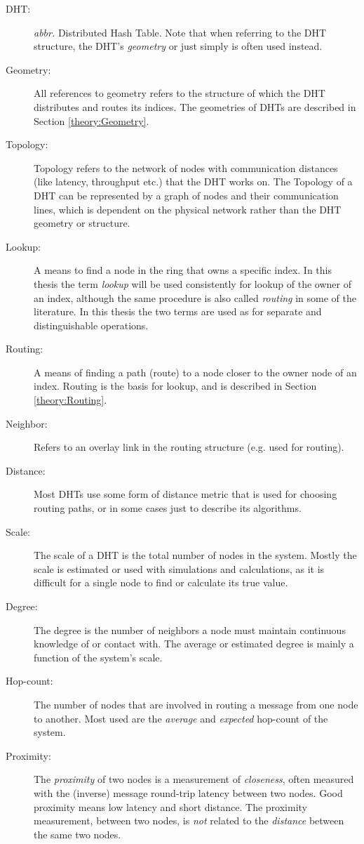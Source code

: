 \begin{description}
  \item[ DHT: ] {\small\em abbr.}
     Distributed Hash Table. Note that when referring to the DHT structure, the
     DHT's \emph{geometry} or just simply  is often used instead.
  \item[ Geometry: ]
     All references to geometry refers to the structure of which the DHT
     distributes and routes its indices. The geometries of DHTs are described
     in Section \ref{theory:Geometry}.
  \item[ Topology: ]
     Topology refers to the network of nodes with communication distances
     (like latency, throughput etc.) that the DHT works on.
     The Topology of a DHT can be represented
     by a graph of nodes and their communication lines, which is dependent
     on the physical network rather than the DHT geometry or structure.
  \item[ Lookup: ]
     A means to find a node in the ring that owns a specific index. In this
     thesis the term \emph{lookup} will be used consistently for lookup of the
     owner of an index, although the same procedure is also called
     \emph{routing} in some of the literature. In this thesis the two terms are
     used as for separate and distinguishable operations.
  \item[ Routing: ]
     A means of finding a path (route) to a node closer to the owner node of
     an index. Routing is the basis for lookup, and is described in Section
     \ref{theory:Routing}.
  \item[ Neighbor: ]
     Refers to an overlay link in the routing structure (e.g. used for routing).
  \item[ Distance: ]
     Most DHTs use some form of distance metric that is used for choosing routing paths,
     or in some cases just to describe its algorithms.
  \item[ Scale: ]
     The scale of a DHT is the total number of nodes in the system. Mostly the
     scale is estimated or used with simulations and calculations, as it is difficult
     for a single node to find or calculate its true value.
  \item[ Degree: ]
     The degree is the number of neighbors a node must maintain continuous knowledge
     of or contact with. The average or estimated degree is mainly a function of
     the system's scale.
  \item[ Hop-count: ]
     The number of nodes that are involved in routing a message from one node to another.
     Most used are the \emph{average} and \emph{expected} hop-count of the system.
  \item[ Proximity: ]
     The \emph{proximity} of two nodes is a measurement of \emph{closeness}, often
     measured with the (inverse) message round-trip latency
     between two nodes. Good proximity means low latency and short distance. The
     proximity measurement, between two nodes, is \emph{not} related to the \emph{distance}
     between the same two nodes.
\end{description}

